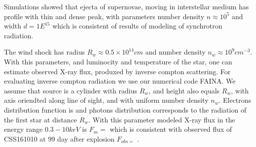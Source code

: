 \documentclass[a4paper,12pt]{extreport}
\begin{document}
Simulations showed that ejecta of supernovae, moving in interstellar medium has profile with thin and dense peak, with parameters number density $n \approx 10^5$ and width $d = 1E^{15}$ which is consistent of results of modeling of synchrotron radiation.

The wind shock has radius $R_w \approx 0.5\times10^14 cm$ and number density $n_w \approx 10^9 cm^{-3}$. With this parameters, and luminocity and temperature of the star, one can estimate observed X-ray flux, produxed by inverse compton scattering. For evaluating inverse compton radiation we use our numerical code FAINA. We assume that source is a cylinder with radius $R_w$, and height also equals $R_w$, with axis oriendted along line of sight, and with uniform number density $n_w$. Electrons distribution function is 
and photons distribution corresponds to the radiation of the first star at distance $R_w$. With this parameter modeled X-ray flux in the energy range $0.3-10 keV$ is $F_m = $ which is consistent with observed flux of CSS161010 at 99 day after explosion $F_{obs = }$ \cite{Coppejans2020}.



\end{document}
